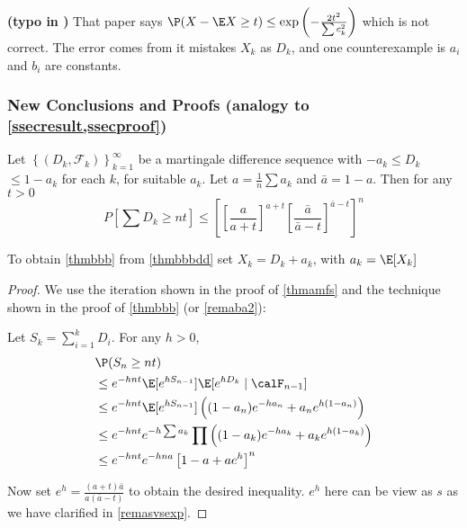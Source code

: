 \documentclass{article}
\newcommand{\bfs}[1]{\textbf{({#1})}}
\begin{document}
\begin{rema}{\bfs{typo in \cite{mcdiarmid1989method}}}
That paper says $\P( X - \E X \geq t ) \leq \exp \left(-\frac{2t ^{2} }{\sum c_{ k }^{2}}\right)$ which is not correct. The error comes from it mistakes $X_k$ as $D_k$, and one counterexample is $a_i$ and $b_i$ are constants.
\end{rema}
\subsubsection{New Conclusions and Proofs (analogy to \cref{ssecresult,ssecproof})}

\begin{thma}\label{thmbbbdd}
Let $\left\{\left(D_{k}, \mathcal{F}_{k}\right)\right\}_{k=1}^{\infty}$ be a martingale difference sequence with $-a_{k} \leq D_{k}$ $\leq 1- a _{ k }$ for each $k$, for suitable  $a _{ k }$. Let $a =\frac{1}{ n } \sum a_{ k }$ and $\bar{ a }=1- a$. Then
for any $t>0$
$$
P \left[ \sum D_{ k } \geq nt \right] \leq\left[\left[\frac{ a }{ a + t }\right]^{ a + t }\left[\frac{\bar{ a }}{\bar{ a }- t }\right]^{\bar{ a }- t }\right]^{ n }
$$
\end{thma} 
\begin{rema}
To obtain \cref{thmbbb} from \cref{thmbbbdd} set $X _{ k }= D_{ k }+a_{ k }$, with $a_k =\E[X_k]$
\end{rema}

\begin{proof}
We use the iteration shown in the proof of \cref{thmamfs} and the technique shown in the proof of \cref{thmbbb} (or \cref{remaba2}):

 Let $S_{k}=\sum_{i=1}^{k} D_{i}$. For any $h >0$,
\begin{align*}
 &\P (S_{ n } \geq nt)\\
&\leq e ^{- hnt } \E[e^{hS_{ n -1}}]\E[e^{hD_k}\mid \calF_{n-1}]\\
&\leq e ^{- hnt } \E[e^{hS_{ n -1}}]\left((1-a_n)e^{-ha_n}+a_n e^{h(1-a_n)}\right)\\
&\leq e ^{- hnt } e^{-h\sum a_k}\prod \left((1-a_k)e^{-ha_k}+a_k e^{h(1-a_k)}\right)\\
&\leq e^{-h n t} e^{-h n a}\left[1-a+a e^{h}\right]^{n}
\end{align*}

Now set $e ^{ h }=\frac{( a + t ) \bar{ a }}{ a (\bar{ a }- t )}$ to obtain the desired inequality. $e^h$ here can be view as $s$ as we have clarified in \cref{remasvsexp}.

\end{proof}
\end{document}
